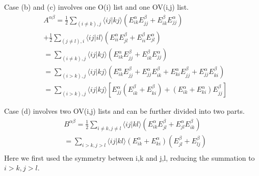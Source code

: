 \documentclass[twocolumn]{article}
\begin{document}
Case (b) and (c) involves one O(i) list and one OV(i,j) list.
\begin{equation}
  \begin{split}
    &A^{\alpha\beta}=\frac{1}{2}\sum_{(i\neq k),j}\langle ij|kj\rangle (E_{ik}^{\alpha}E_{jj}^{\beta}+E_{ik}^{\beta}E_{jj}^{\alpha})\\
    &+\frac{1}{2}\sum_{(j\neq l),i}\langle ij|il\rangle (E_{ii}^{\alpha}E_{jl}^{\beta}+E_{ii}^{\beta}E_{jl}^{\alpha})\\
    &=\sum_{(i\neq k),j}\langle ij|kj\rangle (E_{ik}^{\alpha}E_{jj}^{\beta}+E_{ik}^{\beta}E_{jj}^{\alpha})\\
    &=\sum_{(i>k),j}\langle ij|kj\rangle (E_{ik}^{\alpha}E_{jj}^{\beta}+E_{jj}^{\alpha}E_{ik}^{\beta}+E_{ki}^{\alpha}E_{jj}^{\beta}+E_{jj}^{\alpha}E_{ki}^{\beta})\\
    &=\sum_{(i>k),j}\langle ij|kj\rangle [E_{jj}^{\alpha}(E_{ik}^{\beta}+E_{ki}^{\beta})+(E_{ik}^{\alpha}+E_{ki}^{\alpha})E_{jj}^{\beta}]
  \end{split}
  \label{eq:H2ABA}
\end{equation}

Case (d) involves two OV(i,j) lists and can be further divided into two parts.
\begin{equation}
  \begin{split}
    &B^{\alpha\beta}=\frac{1}{2}\sum_{i\neq k,j\neq l}\langle ij|kl\rangle (E_{ik}^{\alpha}E_{jl}^{\beta}+E_{jl}^{\alpha}E_{ik}^{\beta})\\
    &=\sum_{i>k,j>l}\langle ij|kl\rangle (E_{ik}^\alpha+E_{ki}^\alpha)(E_{jl}^\beta+E_{lj}^\beta)\\
  \end{split}
  \label{eq:H2ABB}
\end{equation}
Here we first used the symmetry between i,k and j,l, reducing the summation to $i>k, j>l$.
\end{document}
